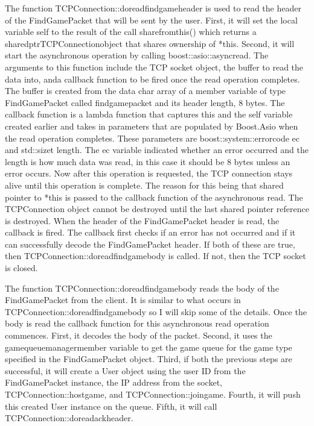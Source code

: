 \documentclass[conference]{IEEEtran}
\begin{document}
The function TCPConnection::do\textunderscore read\textunderscore find\textunderscore game\textunderscore header is used to read the header of the FindGamePacket that will be sent by the user.
First, it will set the local variable self to the result of the call share\textunderscore from\textunderscore this() which returns a shared\textunderscore ptr\textlangle TCPConnection\textrangle object that shares ownership of *this.
Second, it will start the asynchronous operation by calling boost::asio::async\textunderscore read.
The arguments to this function include the TCP socket object, the buffer to read the data into, anda callback function to be fired once the read operation completes.
The buffer is created from the data char array of a member variable of type FindGamePacket called find\textunderscore game\textunderscore packet and its header length, 8 bytes.
The callback function is a lambda function that captures this and the self variable created earlier and takes in parameters that are populated by Boost.Asio when the read operation completes.
These parameters are boost::system::error\textunderscore code ec and std::size\textunderscore t length.
The ec variable indicated whether an error occurred and the length is how much data was read, in this case it should be 8 bytes unless an error occurs.
Now after this operation is requested, the TCP connection stays alive until this operation is complete.
The reason for this being that shared pointer to *this is passed to the callback function of the asynchronous read.
The TCPConnection object cannot be destroyed until the last shared pointer reference is destroyed.
When the header of the FindGamePacket header is read, the callback is fired.
The callback first checks if an error has not occurred and if it can successfully decode the FindGamePacket header.
If both of these are true, then TCPConnection::do\textunderscore read\textunderscore find\textunderscore game\textunderscore body is called.
If not, then the TCP socket is closed.

The function TCPConnection::do\textunderscore read\textunderscore find\textunderscore game\textunderscore body reads the body of the FindGamePacket from the client.
It is similar to what occurs in TCPConnection::do\textunderscore read\textunderscore find\textunderscore game\textunderscore body so I will skip some of the details.
Once the body is read the callback function for this asynchronous read operation commences.
First, it decodes the body of the packet.
Second, it uses the game\textunderscore queue\textunderscore manager\textunderscore  member variable to get the game queue for the game type specified in the FindGamePacket object.
Third, if both the previous steps are successful, it will create a User object using the user ID from the FindGamePacket instance, the IP address from the socket, TCPConnection::host\textunderscore game, and TCPConnection::join\textunderscore game. 
Fourth, it will push this created User instance on the queue.
Fifth, it will call TCPConnection::do\textunderscore read\textunderscore ack\textunderscore header.
\end{document}
